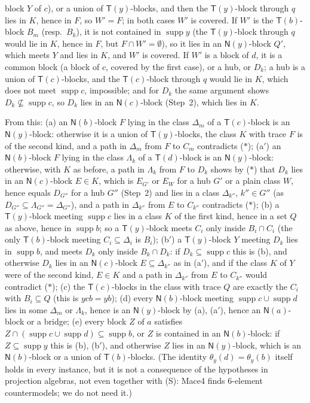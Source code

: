 \documentclass[11pt]{amsart}
\theoremstyle{definition}
\newcommand{\supp}{\operatorname{supp}}
\newcommand{\T}{\mathsf{T}}
\newcommand{\N}{\mathsf{N}}
\begin{document}
block $Y$ of $c$), or a union of $\T(y)$-blocks, and then the $\T(y)$-block through $q$ lies in $K$, hence in $F$, so $W'=F$; in both cases $W'$ is covered. If $W'$ is the $\T(b)$-block $B_m$ (resp.\ $B_k$), it is not contained in $\supp y$ (the $\T(y)$-block through $q$ would lie in $K$, hence in $F$, but $F\cap W'=\emptyset$), so it lies in an $\N(y)$-block $Q'$, which meets $Y$ and lies in $K$, and $W'$ is covered. If $W'$ is a block of $d$, it is a common block (a block of $c$, covered by the first case), or a hub, or $D_k$; a hub is a union of $\T(c)$-blocks, and the $\T(c)$-block through $q$ would lie in $K$, which does not meet $\supp c$, impossible; and for $D_k$ the same argument shows $D_k\not\subseteq\supp c$, so $D_k$ lies in an $\N(c)$-block (Step~2), which lies in $K$.

From this: (a) an $\N(b)$-block $F$ lying in the class $\Delta_m$ of a $\T(c)$-block is an $\N(y)$-block: otherwise it is a union of $\T(y)$-blocks, the class $K$ with trace $F$ is of the second kind, and a path in $\Delta_m$ from $F$ to $C_m$ contradicts ($*$); (a$'$) an $\N(b)$-block $F$ lying in the class $\Lambda_k$ of a $\T(d)$-block is an $\N(y)$-block: otherwise, with $K$ as before, a path in $\Lambda_k$ from $F$ to $D_k$ shows by ($*$) that $D_k$ lies in an $\N(c)$-block $E\in K$, which is $E_{G'}$ or $E_W$ for a hub $G'$ or a plain class $W$, hence equals $D_{G''}$ for a hub $G''$ (Step~2) and lies in a class $\Delta_{k''}$, $k''\in G''$ (as $D_{G''}\subseteq\Lambda_{G''}=\Delta_{G''}$), and a path in $\Delta_{k''}$ from $E$ to $C_{k''}$ contradicts ($*$); (b) a $\T(y)$-block meeting $\supp c$ lies in a class $K$ of the first kind, hence in a set $Q$ as above, hence in $\supp b$; so a $\T(y)$-block meets $C_i$ only inside $B_i\cap C_i$ (the only $\T(b)$-block meeting $C_i\subseteq\Delta_i$ is $B_i$); (b$'$) a $\T(y)$-block $Y$ meeting $D_k$ lies in $\supp b$, and meets $D_k$ only inside $B_k\cap D_k$: if $D_k\subseteq\supp c$ this is (b), and otherwise $D_k$ lies in an $\N(c)$-block $E\subseteq\Delta_{k''}$ as in (a$'$), and if the class $K$ of $Y$ were of the second kind, $E\in K$ and a path in $\Delta_{k''}$ from $E$ to $C_{k''}$ would contradict ($*$); (c) the $\T(c)$-blocks in the class with trace $Q$ are exactly the $C_i$ with $B_i\subseteq Q$ (this is $ycb=yb$); (d) every $\N(b)$-block meeting $\supp c\cup\supp d$ lies in some $\Delta_m$ or $\Lambda_k$, hence is an $\N(y)$-block by (a), (a$'$), hence an $\N(a)$-block or a bridge; (e) every block $Z$ of $a$ satisfies $Z\cap(\supp c\cup\supp d)\subseteq\supp b$, or $Z$ is contained in an $\N(b)$-block: if $Z\subseteq\supp y$ this is (b), (b$'$), and otherwise $Z$ lies in an $\N(y)$-block, which is an $\N(b)$-block or a union of $\T(b)$-blocks. (The identity $\theta_y(d)=\theta_y(b)$ itself holds in every instance, but it is not a consequence of the hypotheses in projection algebras, not even together with (S): Mace4 finds $6$-element countermodels; we do not need it.)
\end{document}
